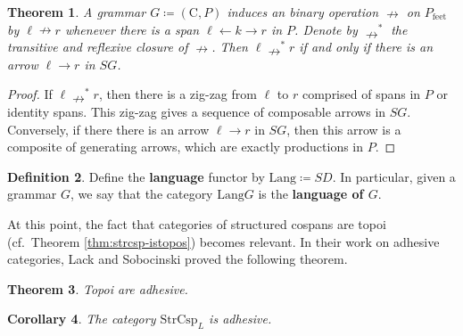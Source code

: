 \documentclass{amsart}
\newcommand{\C}{\cat{C}}
\newcommand{\StrCsp}{\cat{StrCsp}}
\newcommand{\Lang}{\mathrm{Lang}}
\newcommand{\defn}[1]{\textbf{#1}}
\newcommand{\cat}[1]{\mathrm{#1}}
\renewcommand{\t}[1]{\text{#1}}
\newcommand{\rel}{\nrightarrow}
\newtheorem{theorem}{Theorem}[section]
\newtheorem{corollary}[theorem]{Corollary}
\theoremstyle{remark}
\theoremstyle{definition}
\newtheorem{definition}[theorem]{Definition}
\begin{document}
\begin{theorem}

  A grammar $ G \coloneqq ( \C , P ) $ induces an binary operation
  $ \rel $ on $ P_{\t{feet}} $
  by $ \ell \rel r $ whenever there is a span
  $ \ell \gets k \to r $ in $ P $. Denote by $ \rel^\ast $ the
  transitive and reflexive closure of $ \nrightarrow $. Then $ \ell
  \rel^\ast r $ if and only if there is an arrow $ \ell \to r
  $ in $ SG $.
  
\end{theorem}
 
\begin{proof}

  If $ \ell \rel^\ast r $, then there is a zig-zag from $ \ell
  $ to $ r $ comprised of spans in $ P $ or identity spans.  This
  zig-zag gives a sequence of composable arrows in $ SG $.
  Conversely, if there there is an arrow $ \ell \to r $ in $ SG $,
  then this arrow is a composite of generating arrows, which are
  exactly productions in $ P $.
  
\end{proof}

\begin{definition}

  Define the \defn{language} functor by $ \Lang \coloneqq SD $. In
  particular, given a grammar $ G $, we say that the category $ \Lang
  G $ is the \defn{language of $ G $}.
  
\end{definition}

At this point, the fact that categories of structured cospans are
topoi (cf.~Theorem \ref{thm:strcsp-istopos}) becomes relevant. In
their work on adhesive categories, Lack and Sobocinski proved the
following theorem.  
% 
%

\begin{theorem} \label{thm:dpo_topoi-adhesive} 
  Topoi are adhesive.
\end{theorem}

\begin{corollary} \label{thm:dpo_category-StrCsp-adhsv}
  The category $ \StrCsp_{L} $ is adhesive.
\end{corollary}
\end{document}
